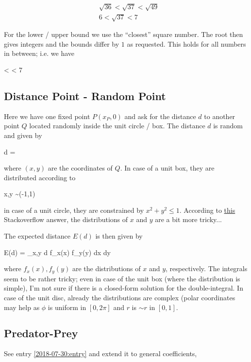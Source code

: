 \begin{align*}
  &\sqrt{36} < \sqrt{37} < \sqrt{49} \\
  & 6 < \sqrt{37} < 7
\end{align*}

For the lower / upper bound we use the ``closest'' square number. The root then gives integers and the bounds differ by $1$ as requested. This holds for all numbers in between; i.e. we have

 <  \cdots {} < 7
\eee


\subsection{Distance Point - Random Point}

Here we have one fixed point $P(x_P,0)$ and ask for the distance $d$ to another point $Q$ located randomly inside the unit circle / box. The distance $d$ is random and given by

\bee
d = 
\eee

where $(x,y)$ are the coordinates of $Q$. In case of a unit box, they are distributed according to

\bee
x,y \sim \Uc(-1,1)
\eee

in case of a unit circle, they are constrained by $x^2 + y^2 \leq 1$. According to \href{https://stats.stackexchange.com/questions/481543/generating-random-points-uniformly-on-a-disk}{this} Stackoverflow answer, the distributions of $x$ and $y$ are a bit more tricky...

The expected distance $E(d)$ is then given by

\bee
E(d) = \int_{x,y} d f_x(x) f_y(y) dx dy
\eee

where $f_x(x), f_y(y)$ are the distributions of $x$ and $y$, respectively. The integrals seem to be rather tricky; even in case of the unit box (where the distribution is simple), I'm not sure if there is a closed-form solution for the double-integral. In case of the unit disc, already the distributions are complex (polar coordinates may help as $\phi$ is uniform in $[0, 2\pi]$ and $r$ is $\sim  r$ in $[0,1]$.

\subsection{Predator-Prey}

See entry \ref{2018-07-30:entry} and extend it to general coefficients,

